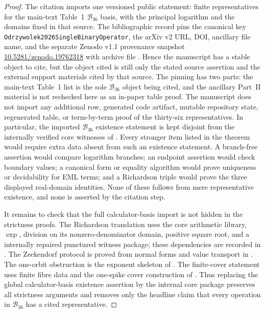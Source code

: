 \begin{proof}
The citation  imports one versioned public statement:
finite representatives for the main-text Table~1 \(\mathcal B_{36}\) basis, with
the principal logarithm and the domains fixed in that source.  The bibliographic
record pins the canonical key \texttt{Odrzywolek2026SingleBinaryOperator}, the
arXiv v2 URL, DOI, ancillary file name, and the separate Zenodo v1.1 provenance
snapshot \url{10.5281/zenodo.19762318} with archive file
.  Hence the manuscript has a
stable object to cite, but the object cited is still only the stated source
assertion and the external support materials cited by that source.
The pinning has two parts: the main-text Table~1 list is the sole \(\mathcal B_{36}\)
object being cited, and the ancillary Part~II material is not rechecked here as an
in-paper table proof.  The manuscript does not import any additional row,
generated code artifact, mutable repository state, regenerated table, or
term-by-term proof of the thirty-six representatives.  In
particular, the imported \(\mathcal B_{36}\) existence statement is kept disjoint
from the internally verified core witnesses of
.
Every stronger item listed in the theorem would require extra data
absent from such an existence statement.  A branch-free assertion would compare
logarithm branches; an endpoint assertion would check boundary values; a
canonical form or equality algorithm would prove uniqueness or decidability for
EML terms; and a Richardson triple would prove the three displayed real-domain
identities.  None of these follows from mere representative existence, and none
is asserted by the citation step.

It remains to check that the full calculator-basis import is not hidden in the
strictness proofs.  The Richardson translation uses the core arithmetic library,
\(\exp\), division on its nonzero-denominator domain, positive square root, and a
internally repaired punctured witness package; these dependencies are recorded in
.  The Zeckendorf
protocol is proved from normal forms and value transport in
.  The one-orbit obstruction is the exponent
skeleton of .  The finite-cover statement uses
finite fibre data and the one-spike cover construction of
.  Thus replacing the global calculator-basis
existence assertion by the internal core package preserves all strictness
arguments and removes only the headline claim that every operation in
\(\mathcal B_{36}\) has a cited representative.
\end{proof}

